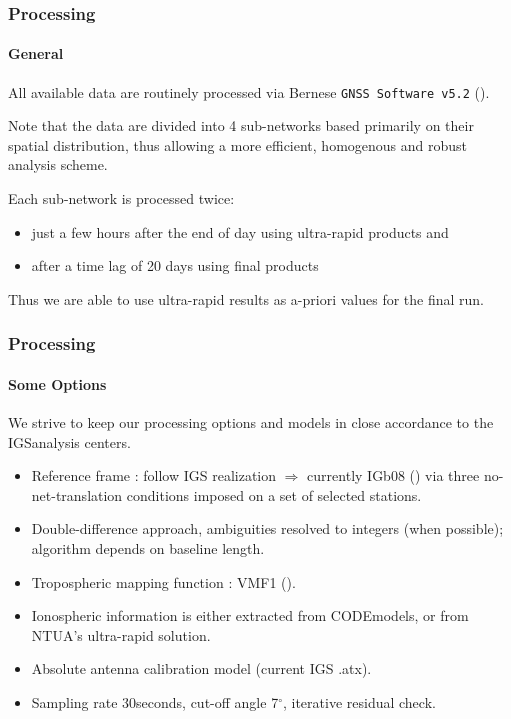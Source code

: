 \documentclass{beamer}
\begin{document}
\begin{frame}\frametitle{Processing}\framesubtitle{General}

    All available data are routinely processed via Bernese \texttt{GNSS Software v5.2} (\cite{bpe}).
    
    Note that the data are divided into 4 sub-networks based primarily on their spatial distribution, 
    thus allowing a more efficient, homogenous and robust analysis scheme.
    
    Each sub-network is processed twice:
    \begin{itemize}
    \item just a few hours after the end of day using ultra-rapid products and
    \item after a time lag of 20 days using final products
    \end{itemize}

    Thus we are able to use ultra-rapid results as a-priori values for the final run.

\end{frame}

\begin{frame}\frametitle{Processing}\framesubtitle{Some Options}

    We strive to keep our processing options and models in close accordance to the IGS\footnotemark analysis centers.

    \begin{itemize}
    \item Reference frame : follow IGS realization $\Rightarrow$ currently IGb08 (\cite{igb08}) via three no-net-translation conditions imposed on a set of
    selected stations.
    \item Double-difference approach, ambiguities resolved to integers (when possible); algorithm depends on baseline length.
    \item Tropospheric mapping function : VMF1 (\cite{vmf1}).
    \item Ionospheric information is either extracted from CODE\footnotemark models, 
    or from NTUA's ultra-rapid solution.
    \item Absolute antenna calibration model (current IGS .atx).
    \item Sampling rate 30seconds, cut-off angle 7$^{\circ}$, iterative residual check.
    \end{itemize}

\end{frame}
\end{document}
